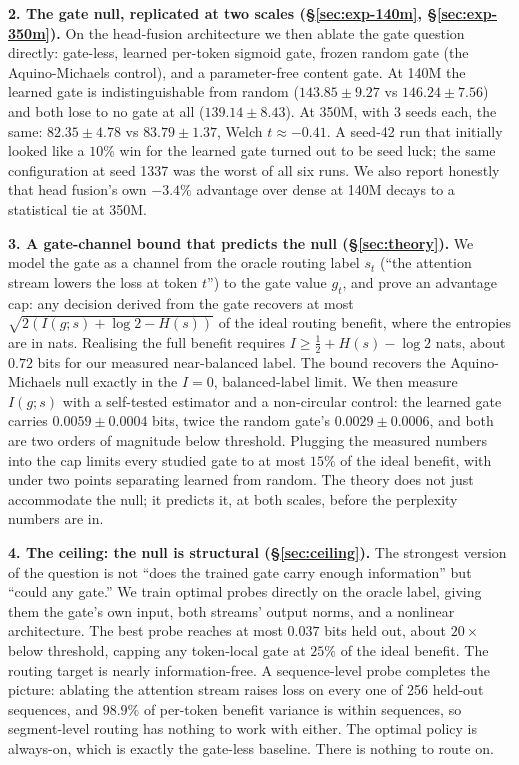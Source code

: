 \documentclass[11pt,a4paper]{article}
\begin{document}
\textbf{2. The gate null, replicated at two scales
(\S\ref{sec:exp-140m}, \S\ref{sec:exp-350m}).} On the head-fusion
architecture we then ablate the gate question directly: gate-less, learned
per-token sigmoid gate, frozen random gate (the Aquino-Michaels control),
and a parameter-free content gate. At 140M the learned gate is
indistinguishable from random ($143.85 \pm 9.27$ vs $146.24 \pm 7.56$) and
both lose to no gate at all ($139.14 \pm 8.43$). At 350M, with 3 seeds
each, the same: $82.35 \pm 4.78$ vs $83.79 \pm 1.37$, Welch
$t \approx -0.41$. A seed-42 run that initially looked like a $10\%$ win
for the learned gate turned out to be seed luck; the same configuration at
seed 1337 was the worst of all six runs. We also report honestly that head
fusion's own $-3.4\%$ advantage over dense at 140M decays to a
statistical tie at 350M.

\textbf{3. A gate-channel bound that predicts the null
(\S\ref{sec:theory}).} We model the gate as a channel from the oracle
routing label $s_t$ (``the attention stream lowers the loss at token $t$'')
to the gate value $g_t$, and prove an advantage cap: any decision derived
from the gate recovers at most
$\sqrt{2(I(g;s) + \log 2 - H(s))}$ of the ideal routing benefit, where the
entropies are in nats. Realising the full benefit requires
$I \geq \tfrac12 + H(s) - \log 2$ nats, about $0.72$ bits for our measured
near-balanced label. The bound recovers the Aquino-Michaels null exactly
in the $I = 0$, balanced-label limit. We then measure $I(g;s)$ with a
self-tested estimator and a non-circular control: the learned gate carries
$0.0059 \pm 0.0004$ bits, twice the random gate's $0.0029 \pm 0.0006$, and
both are two orders of magnitude below threshold. Plugging the measured
numbers into the cap limits every studied gate to at most $15\%$ of the
ideal benefit, with under two points separating learned from random. The
theory does not just accommodate the null; it predicts it, at both scales,
before the perplexity numbers are in.

\textbf{4. The ceiling: the null is structural (\S\ref{sec:ceiling}).}
The strongest version of the question is not ``does the trained gate carry
enough information'' but ``could any gate.'' We train optimal probes
directly on the oracle label, giving them the gate's own input, both
streams' output norms, and a nonlinear architecture. The best probe
reaches at most $0.037$ bits held out, about $20\times$ below threshold,
capping any token-local gate at $25\%$ of the ideal benefit. The routing target is
nearly information-free. A sequence-level probe completes the picture:
ablating the attention stream raises loss on every one of 256 held-out
sequences, and $98.9\%$ of per-token benefit variance is within sequences,
so segment-level routing has nothing to work with either. The optimal
policy is always-on, which is exactly the gate-less baseline. There is
nothing to route on.
\end{document}
